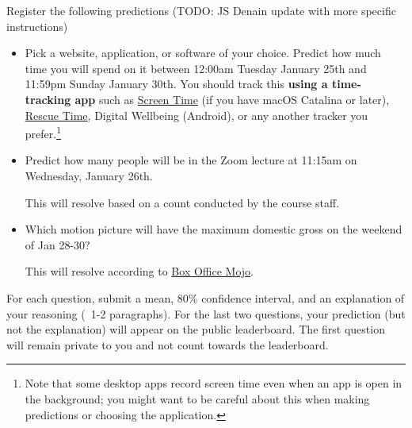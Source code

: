 \documentclass[11pt]{article}
\begin{document}
Register the following predictions (TODO: JS Denain update with more specific instructions)

\begin{itemize}
\item Pick a website, application, or software of your choice. Predict how much time you will spend on it between 12:00am Tuesday January 25th and 11:59pm Sunday January 30th. You should track this {\bf using a time-tracking app} such as \href{https://support.apple.com/en-us/HT210387}{Screen Time} (if you have macOS Catalina or later), \href{https://www.rescuetime.com/}{Rescue Time}, Digital Wellbeing (Android), or any another tracker you prefer.\footnote{Note that some desktop apps record screen time even when an app is open in the background; you might want to be careful about this when making predictions or choosing the application.}

\item Predict how many people will be in the Zoom lecture at 11:15am on Wednesday, January 26th.

      This will resolve based on a count conducted by the course staff.

\item Which motion picture will have the maximum domestic gross on the weekend of Jan 28-30?

      This will resolve according to \href{https://www.boxofficemojo.com/weekend/?ref_=bo_nb_wey_secondarytab}{Box Office Mojo}.

\end{itemize}

For each question, submit a mean, 80\% confidence interval, and an explanation of your reasoning (~1-2 paragraphs).
For the last two questions, your prediction (but not the explanation) will appear on the public leaderboard. 
The first question will remain private to you and not count towards the leaderboard.
\end{document}
